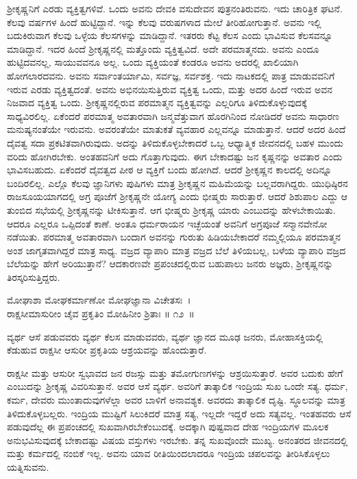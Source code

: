 ಶ‍್ರೀಕೃಷ್ಣನಿಗೆ ಎರಡು ವ್ಯಕ್ತಿತ್ವಗಳಿವೆ. ಒಂದು ಅವನು ದೇವಕಿ ವಸುದೇವನ ಪುತ್ರನಂತಿರುವನು. ಇದು ಚಾರಿತ್ರಿಕ ಘಟನೆ. ಕೆಲವು ವರ್ಷಗಳ ಹಿಂದೆ ಹುಟ್ಟಿದ್ದಾನೆ. ಇನ್ನು ಕೆಲವು ವರುಷಗಳಾದ ಮೇಲೆ ತೀರಿಹೋಗುತ್ತಾನೆ. ಅವನು ಇಲ್ಲಿ ಬದುಕಿರುವಾಗ ಕೆಲವು ಒಳ್ಳೆಯ ಕೆಲಸಗಳನ್ನು ಮಾಡಿದ್ದಾನೆ. ಇತರರು ಕೆಟ್ಟ ಕೆಲಸ ಎಂದು ಭಾವಿಸುವ ಕೆಲಸವನ್ನೂ ಮಾಡಿದ್ದಾನೆ. ಇದರ ಹಿಂದೆ ಶ‍್ರೀಕೃಷ್ಣನಲ್ಲಿ ಮತ್ತೊಂದು ವ್ಯಕ್ತಿತ್ವವಿದೆ. ಅದೇ ಪರಮಾತ್ಮನದು. ಅವನು ಎಂದೂ ಹುಟ್ಟಿದವನಲ್ಲ, ಸಾಯುವವನೂ ಅಲ್ಲ. ಒಂದು ವ್ಯಕ್ತಿಯಂತೆ ಕಂಡರೂ ಅವನು ಅದರಲ್ಲಿ ಖಾಲಿಯಾಗಿ ಹೋಗಲಾರದವನು. ಅವನು ಸರ್ವಾಂತರ್ಯಾಮಿ, ಸರ್ವಜ್ಞ, ಸರ್ವಶಕ್ತ. ಇದು ನಾಟಕದಲ್ಲಿ ಪಾತ್ರ ಮಾಡುವವನಿಗೆ ಇರುವ ಎರಡು ವ್ಯಕ್ತಿತ್ವದಂತೆ. ಅವನು ಅಭಿನಯಿಸುತ್ತಿರುವ ವ್ಯಕ್ತಿತ್ವ ಒಂದು, ಮತ್ತು ಅದರ ಹಿಂದೆ ಇರುವ ಅವನ ನಿಜವಾದ ವ್ಯಕ್ತಿತ್ವ ಒಂದು. ಶ‍್ರೀಕೃಷ್ಣನಲ್ಲಿರುವ ಪರಮಾತ್ಮನ ವ್ಯಕ್ತಿತ್ವವನ್ನು ಎಲ್ಲರಿಗೂ ತಿಳಿದುಕೊಳ್ಳುವುದಕ್ಕೆ ಸಾಧ್ಯವಿರಲಿಲ್ಲ. ಏಕೆಂದರೆ ಪರಮಾತ್ಮ ಅವತಾರವಾಗಿ ಜನ್ಮವೆತ್ತುವಾಗ ಹೊರಗಿನಿಂದ ನೋಡಿದರೆ ಅವನು ಸಾಧಾರಣ ಮನುಷ್ಯನಂತೆಯೇ ಇರುವನು. ಅವರಂತೆಯೇ ಮಾತುಕತೆ ವ್ಯವಹಾರ ಎಲ್ಲವನ್ನೂ ಮಾಡುತ್ತಾನೆ. ಆದರೆ ಅದರ ಹಿಂದೆ ದೈವತ್ವ ಸದಾ ಪ್ರಕಟಿತವಾಗಿರುವುದು. ಅದನ್ನು ತಿಳಿದುಕೊಳ್ಳಬೇಕಾದರೆ ಒಬ್ಬ ಆಧ್ಯಾತ್ಮಿಕ ಜೀವನದಲ್ಲಿ ಬಹಳ ಮುಂದು ವರಿದು ಹೋಗಿರಬೇಕು. ಅಂತಹವನಿಗೆ ಅದು ಗೊತ್ತಾಗುವುದು. ಈಗ ಬೇಕಾದಷ್ಟು ಜನ ಕೃಷ್ಣನನ್ನು ಅವತಾರ ಎಂದು ಭಾವಿಸಬಹುದು. ಏಕೆಂದರೆ ದೈವತ್ವದ ಪೀಠ ಆ ವ್ಯಕ್ತಿಗೆ ಬಂದು ಹೋಗಿದೆ. ಆದರೆ ಶ‍್ರೀಕೃಷ್ಣನ ಕಾಲದಲ್ಲಿ ಅದಿನ್ನೂ ಬಂದಿರಲಿಲ್ಲ. ಎಲ್ಲೊ ಕೆಲವು ಜ್ಞಾನಿಗಳು ಪುಷಿಗಳು ಮಾತ್ರ ಶ‍್ರೀಕೃಷ್ಣನ ಮಹಿಮೆಯನ್ನು ಬಲ್ಲವರಾಗಿದ್ದರು. ಯುಧಿಷ್ಠಿರನ ರಾಜಸೂಯಯಾಗದಲ್ಲಿ ಅಗ್ರ ಪೂಜೆಗೆ ಶ‍್ರೀಕೃಷ್ಣನೇ ಯೋಗ್ಯ ಎಂದು ಭೀಷ್ಮರು ಸಾರುತ್ತಾರೆ. ಆದರೆ ಶಿಶುಪಾಲ ಎದ್ದು ಆ ತುಂಬಿದ ಸಭೆಯಲ್ಲಿ ಶ‍್ರೀಕೃಷ್ಣನನ್ನು ಟೀಕಿಸುತ್ತಾನೆ. ಆಗ ಭೀಷ್ಮರು ಶ‍್ರೀಕೃಷ್ಣ ಯಾರು ಎಂಬುದನ್ನು ಹೇಳಬೇಕಾಯಿತು. ಆದರೂ ಎಲ್ಲರೂ ಒಪ್ಪಿದಂತೆ ಕಾಣೆ. ಅಂತೂ ಧರ್ಮರಾಯನ ಇಚ್ಛೆಯಂತೆ ಅವನಿಗೆ ಅಗ್ರಪೂಜೆ ಸನ್ಮಾನವೇನೋ ನಡೆಯಿತು. ಪರಮಾತ್ಮ ಅವತಾರವಾಗಿ ಬಂದಾಗ ಅವನನ್ನು ಗುರುತು ಹಿಡಿಯಬೇಕಾದರೆ ನಮ್ಮಲ್ಲಿಯೂ ಪರಮಾತ್ಮನ ಅಂಶ ಜಾಗೃತವಾಗಿದ್ದರೆ ಮಾತ್ರ ಸಾಧ್ಯ. ವಜ್ರದ ವ್ಯಾಪಾರಿ ಮಾತ್ರ ವಜ್ರದ ಬೆಲೆ ತಿಳಿಯಬಲ್ಲ, ಬಳೆಯ ವ್ಯಾಪಾರಿ ವಜ್ರದ ಬೆಲೆಯನ್ನು ಹೇಗೆ ಅರಿಯುತ್ತಾನೆ? ಆದಕಾರಣವೇ ಪ್ರಪಂಚದಲ್ಲಿರುವ ಬಹುಪಾಲು ಜನರು ಅಜ್ಞರು, ಶ‍್ರೀಕೃಷ್ಣನನ್ನು ತಿರಸ್ಕರಿಸುತ್ತಿದ್ದರು.

\begin{shloka}
ಮೋಘಾಶಾ ಮೋಘಕರ್ಮಾಣೋ ಮೋಘಜ್ಞಾನಾ ವಿಚೇತಸಃ~।\\ರಾಕ್ಷಸೀಮಾಸುರೀಂ ಚೈವ ಪ್ರಕೃತಿಂ ಮೋಹಿನೀಂ ಶ್ರಿತಾಃ \hfill॥ ೧೨~॥
\end{shloka}

\newpage

\begin{artha}
ವ್ಯರ್ಥ ಆಸೆ ಪಡುವವರು ವ್ಯರ್ಥ ಕೆಲಸ ಮಾಡುವವರು, ವ್ಯರ್ಥ ಜ್ಞಾನದ ಮೂಢ ಜನರು, ಮೋಹಾಸಕ್ತಿಯಲ್ಲಿ ಕೆಡುಹುವ ರಾಕ್ಷಸೀ ಆಸುರೀ ಪ್ರಕೃತಿಯ ಆಶ್ರಯವನ್ನು ಹೊಂದುತ್ತಾರೆ.
\end{artha}

ರಾಕ್ಷಸೀ ಮತ್ತು ಆಸುರೀ ಸ್ವಭಾವದ ಜನ ರಜಸ್ಸು ಮತ್ತು ತಮೋಗುಣಗಳನ್ನು ಆಶ್ರಯಿಸುತ್ತಾರೆ. ಅವರ ಬದುಕು ಹೇಗೆ ಎಂಬುದನ್ನು ಶ‍್ರೀಕೃಷ್ಣ ವಿವರಿಸುತ್ತಾನೆ. ಅವರ ಆಸೆ ವ್ಯರ್ಥ. ಅವರಿಗೆ ತಾತ್ಕಾಲಿಕ ಇಂದ್ರಿಯ ಸುಖ ಒಂದೇ ಸತ್ಯ. ಧರ್ಮ, ಕರ್ಮ, ದೇವರು ಮುಂತಾದುವುಗಳೆಲ್ಲಾ ಅವರ ಬಾಳಿಗೆ ಅನಾವಶ್ಯಕ. ಅವರದು ತಾತ್ಕಾಲಿಕ ದೃಷ್ಟಿ. ಸ್ಥೂಲವನ್ನು ಮಾತ್ರ ತಿಳಿದುಕೊಳ್ಳಬಲ್ಲರು. ಇಂದ್ರಿಯ ಮುಷ್ಟಿಗೆ ಸಿಲುಕಿದರೆ ಮಾತ್ರ ಸತ್ಯ, ಇಲ್ಲದೇ ಇದ್ದರೆ ಅದು ಸತ್ಯವಲ್ಲ. ಇಂತಹವರು ಆಸೆ ಪಡುವುದೆಲ್ಲ ಈ ಪ್ರಪಂಚದಲ್ಲಿ ಸುಖವಾಗಿರಬೇಕೆಂಬುದಕ್ಕೆ. ಅದಕ್ಕಾಗಿ ಪುಷ್ಟವಾದ ದೇಹ ಇಂದ್ರಿಯಗಳ ಮೂಲಕ ಅನುಭವಿಸುವುದಕ್ಕೆ ಬೇಕಾದಷ್ಟು ವಿಷಯ ವಸ್ತುಗಳು ಇರಬೇಕು. ತನ್ನ ಸುಖವೊಂದೇ ಮುಖ್ಯ. ಅನಂತರದ ಜೀವನದಲ್ಲಿ ಮತ್ತು ಕರ್ಮದಲ್ಲಿ ನಂಬಿಕೆ ಇಲ್ಲ. ಅವನು ಯಾವ ರೀತಿಯಿಂದಲಾದರೂ ಇಂದ್ರಿಯ ಚಪಲವನ್ನು ತೀರಿಸಿಕೊಳ್ಳಲು ಯತ್ನಿಸುವನು.

